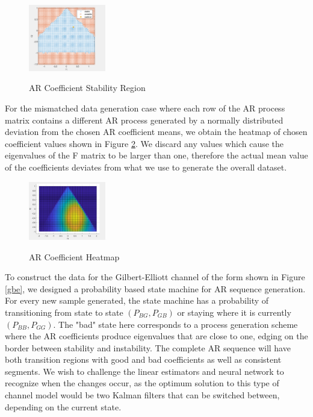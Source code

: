 \documentclass[twocolumn,letterpaper]{IEEEAerospaceCLS}  %
\begin{document}
\begin{figure}[!h]
\centering\includegraphics[width=0.3\textwidth]{figs/stablef1f2.PNG}\\
\caption{AR Coefficient Stability Region}
\label{stabf1f2}
\end{figure}

For the mismatched data generation case where each row of the AR process matrix contains a different AR process generated by a normally distributed deviation from the chosen AR coefficient means, we obtain the heatmap of chosen coefficient values shown in Figure \ref{heatmap}. We discard any values which cause the eigenvalues of the F matrix to be larger than one, therefore the actual mean value of the coefficients deviates from what we use to generate the overall dataset. 

\begin{figure}[!h]
\centering\includegraphics[width=0.3\textwidth]{figs/heatmap.PNG}\\
\caption{AR Coefficient Heatmap}
\label{heatmap}
\end{figure}

\newpage

To construct the data for the Gilbert-Elliott channel of the form shown in Figure \ref{gbe}, we designed a probability based state machine for AR sequence generation. For every new sample generated, the state machine has a probability of transitioning from state to state $(P_{BG}, P_{GB})$ or staying where it is currently $(P_{BB}, P_{GG})$. The "bad" state here corresponds to a process generation scheme where the AR coefficients produce eigenvalues that are close to one, edging on the border between stability and instability. The complete AR sequence will have both transition regions with good and bad coefficients as well as consistent segments. We wish to challenge the linear estimators and neural network to recognize when the changes occur, as the optimum solution to this type of channel model would be two Kalman filters that can be switched between, depending on the current state. 
\end{document}
